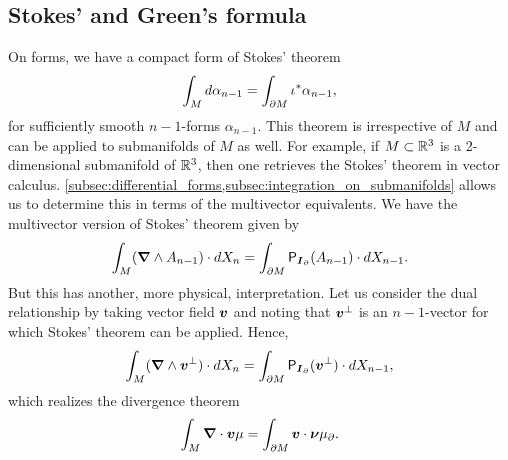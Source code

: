 



\subsection{Stokes' and Green's formula}
On forms, we have a compact form of Stokes' theorem
\begin{equation}
\int_M d \alpha_{n-1} = \int_{{\partial M}} \iota^* \alpha_{n-1},
\end{equation}
for sufficiently smooth $n-1$-forms $\alpha_{n-1}$. This theorem is irrespective of $M$ and can be applied to submanifolds of $M$ as well. For example, if $M\subset \mathbb{R}^3$ is a 2-dimensional submanifold of $\mathbb{R}^3$, then one retrieves the Stokes' theorem in vector calculus. \cref{subsec:differential_forms,subsec:integration_on_submanifolds} allows us to determine this in terms of the multivector equivalents. We have the multivector version of Stokes' theorem given by
\begin{equation}
\label{eq:stokes_theorem}
\int_M (\boldsymbol{\nabla} \wedge A_{n-1})\cdot dX_n = \int_{\partial M} \mathsf{P}_{\boldsymbol{I}_\partial}(A_{n-1}) \cdot dX_{n-1}.
\end{equation}
But this has another, more physical, interpretation. Let us consider the dual relationship by taking vector field $\boldsymbol{v}$ and noting that $\boldsymbol{v}^\perp$ is an $n-1$-vector for which Stokes' theorem can be applied. Hence,
\begin{equation}
\label{eq:stokes_theorem_dual}
\int_M (\boldsymbol{\nabla} \wedge \boldsymbol{v}^\perp) \cdot dX_n = \int_{\partial M} \mathsf{P}_{\boldsymbol{I}_\partial}(\boldsymbol{v}^\perp) \cdot dX_{n-1},
\end{equation}
which realizes the divergence theorem
\begin{equation}
\int_M \boldsymbol{\nabla} \cdot \boldsymbol{v} \mu = \int_{\partial M} \boldsymbol{v}\cdot \boldsymbol{\nu} \mu_\partial.
\end{equation}

